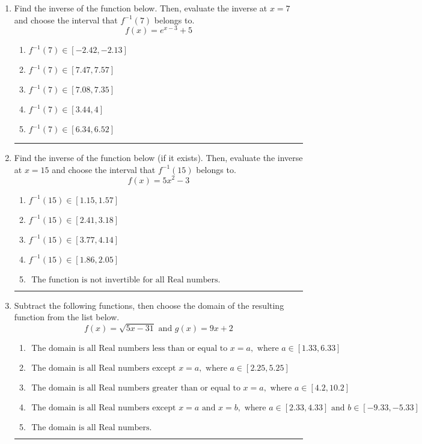 \documentclass[14pt]{extbook}
\newcommand{\litem}[1]{\item#1\hspace*{-1cm}\rule{\textwidth}{0.4pt}}
\begin{document}
\begin{enumerate}
{\begin{enumerate}[label=\Alph*.]
\end{enumerate} }
\litem{
Find the inverse of the function below. Then, evaluate the inverse at $x = 7$ and choose the interval that $f^{-1}(7)$ belongs to.\[ f(x) = e^{x-3}+5 \]\begin{enumerate}[label=\Alph*.]
\item \( f^{-1}(7) \in [-2.42, -2.13] \)
\item \( f^{-1}(7) \in [7.47, 7.57] \)
\item \( f^{-1}(7) \in [7.08, 7.35] \)
\item \( f^{-1}(7) \in [3.44, 4] \)
\item \( f^{-1}(7) \in [6.34, 6.52] \)

\end{enumerate} }
\litem{
Find the inverse of the function below (if it exists). Then, evaluate the inverse at $x = 15$ and choose the interval that $f^{-1}(15)$ belongs to.\[ f(x) = 5 x^2 - 3 \]\begin{enumerate}[label=\Alph*.]
\item \( f^{-1}(15) \in [1.15, 1.57] \)
\item \( f^{-1}(15) \in [2.41, 3.18] \)
\item \( f^{-1}(15) \in [3.77, 4.14] \)
\item \( f^{-1}(15) \in [1.86, 2.05] \)
\item \( \text{ The function is not invertible for all Real numbers. } \)

\end{enumerate} }
\litem{
Subtract the following functions, then choose the domain of the resulting function from the list below.\[ f(x) = \sqrt{5x-31}  \text{ and } g(x) = 9x + 2 \]\begin{enumerate}[label=\Alph*.]
\item \( \text{ The domain is all Real numbers less than or equal to } x = a, \text{ where } a \in [1.33, 6.33] \)
\item \( \text{ The domain is all Real numbers except } x = a, \text{ where } a \in [2.25, 5.25] \)
\item \( \text{ The domain is all Real numbers greater than or equal to } x = a, \text{ where } a \in [4.2, 10.2] \)
\item \( \text{ The domain is all Real numbers except } x = a \text{ and } x = b, \text{ where } a \in [2.33, 4.33] \text{ and } b \in [-9.33, -5.33] \)
\item \( \text{ The domain is all Real numbers. } \)


\end{enumerate}}
\end{enumerate}
\end{document}
